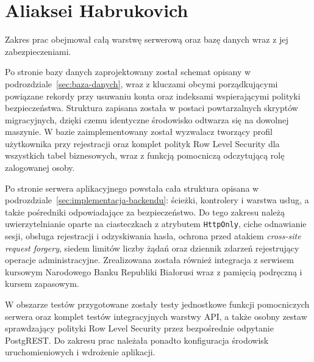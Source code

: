 \section{Aliaksei Habrukovich}
\label{sec:wklad-habrukovich}

Zakres prac obejmował całą warstwę serwerową oraz bazę danych wraz z jej zabezpieczeniami.

Po stronie bazy danych zaprojektowany został schemat opisany w podrozdziale~\ref{sec:baza-danych}, wraz z kluczami obcymi porządkującymi powiązane rekordy przy usuwaniu konta oraz indeksami wspierającymi polityki bezpieczeństwa. Struktura zapisana została w postaci powtarzalnych skryptów migracyjnych, dzięki czemu identyczne środowisko odtwarza się na dowolnej maszynie. W bazie zaimplementowany został wyzwalacz tworzący profil użytkownika przy rejestracji oraz komplet polityk Row Level Security dla wszystkich tabel biznesowych, wraz z funkcją pomocniczą odczytującą rolę zalogowanej osoby.

Po stronie serwera aplikacyjnego powstała cała struktura opisana w podrozdziale~\ref{sec:implementacja-backendu}: ścieżki, kontrolery i warstwa usług, a także pośredniki odpowiadające za bezpieczeństwo. Do tego zakresu należą uwierzytelnianie oparte na ciasteczkach z atrybutem \texttt{HttpOnly}, ciche odnawianie sesji, obsługa rejestracji i odzyskiwania hasła, ochrona przed atakiem \textit{cross-site request forgery}, siedem limitów liczby żądań oraz dziennik zdarzeń rejestrujący operacje administracyjne. Zrealizowana została również integracja z serwisem kursowym Narodowego Banku Republiki Białorusi wraz z pamięcią podręczną i kursem zapasowym.

W obszarze testów przygotowane zostały testy jednostkowe funkcji pomocniczych serwera oraz komplet testów integracyjnych warstwy API, a także osobny zestaw sprawdzający polityki Row Level Security przez bezpośrednie odpytanie PostgREST. Do zakresu prac należała ponadto konfiguracja środowisk uruchomieniowych i wdrożenie aplikacji.
